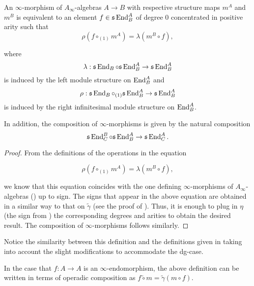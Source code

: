 \documentclass[join.tex]{subfiles}
\begin{document}
\begin{lem}\label{infinitymorphisms}
An $\infty$-morphism of $A_\infty$-algebras $A\to B$ with respective structure maps $m^A$ and $m^B$ is equivalent to an element $f\in\mathfrak{s}\operatorname{End}^A_B$ of degree 0 concentrated in positive arity such that \[\rho(f\circ_{(1)}m^A)=\lambda(m^B\circ f),\] 

where \[\lambda:\mathfrak{s}\operatorname{End}_B\circ \mathfrak{s}\operatorname{End}^A_B\to \mathfrak{s}\operatorname{End}^A_B\] is induced by the left module structure on $\operatorname{End}^A_B$ and \[\rho:\mathfrak{s}\operatorname{End}_B\circ_{(1)}\mathfrak{s}\operatorname{End}^A_B\to \mathfrak{s}\operatorname{End}^A_B\] is induced by the right infinitesimal module structure on $\operatorname{End}^A_B$. 

In addition, the composition of $\infty$-morphisms is given by the natural composition \[\mathfrak{s}\operatorname{End}^B_C\circ \mathfrak{s}\operatorname{End}^A_B\to \mathfrak{s}\operatorname{End}^A_C.\]
\end{lem}
\begin{proof}
From the definitions of the operations in the equation

\[\rho(f\circ_{(1)}m^A)=\lambda(m^B\circ f),\] 

we know that this equation coincides with the one defining $\infty$-morphisms of $A_\infty$-algebras () up to sign. The signs that appear in the above equation are obtained in a similar way to that on $\tilde{\gamma}$ (see the proof of ). Thus, it is enough to plug in $\eta$ (the sign from ) the corresponding degrees and arities to obtain the desired result. The composition of $\infty$-morphisms follows similarly.
\end{proof}
Notice the similarity between this definition and the definitions given in \cite[Section 10.2.4]{lodayvallette} taking into account the slight modifications to accommodate the dg-case.

In the case that $f:A\to A$ is an $\infty$-endomorphism, the above definition can be written in terms of operadic composition as $f\tilde{\circ}m=\tilde{\gamma}(m\circ f)$. 

\end{document}
